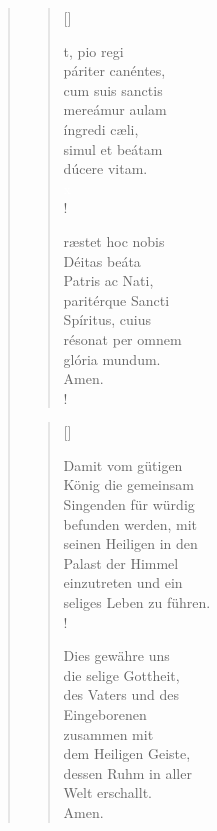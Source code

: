 \begin{quote}

\begin{multicols}{2}
\begin{verse}[\versewidth]


{\small{t, pio regi\\
páriter canéntes,\\ 
cum suis sanctis\\
mereámur aulam\\
íngredi cæli,\\
simul et beátam\\
dúcere vitam.\\
{\textcolor{white}x}\\!
	
ræstet hoc nobis\\
Déitas beáta\\
Patris ac Nati,\\
paritérque Sancti\\
Spíritus, cuius\\
résonat per omnem\\
glória mundum.\\
Amen.\\!}}

\end{verse}

\columnbreak

\begin{verse}[\versewidth]

{\small\rm{ Damit vom gütigen\\
König die gemeinsam \\
Singenden für würdig\\
befunden werden, mit\\
seinen Heiligen in den\\
Palast der Himmel\\
einzutreten und ein\\
seliges Leben zu führen.\\!

 Dies gewähre uns\\
die selige Gottheit,\\ 
des Vaters und des\\
Eingeborenen\\
zusammen mit\\
dem Heiligen Geiste,\\
dessen Ruhm in aller\\
Welt erschallt.\\
Amen.\\}}

\end{verse}
\end{multicols}

\end{quote}

